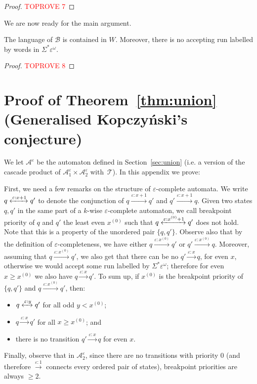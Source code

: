 \documentclass[a4paper,UKenglish,cleveref, thm-restate]{lipics-v2021}
\newcommand\po[1]{\todo[inline,size=\scriptsize,backgroundcolor=pink]{#1 - \textbf{Pierre}}}
\newcommand{\re}[1]{\xrightarrow{#1}}
\newcommand{\rer}[1]{\xleftrightarrow{#1}}
\newcommand{\eps}{\varepsilon}
\newcommand{\A}{\mathcal{A}}
\newcommand{\B}{\mathcal B}
\newcommand{\T}{\mathcal T}
\newcommand{\xbreak}{x^{(0)}}
\begin{document}
\begin{proof}\textcolor{red}{TOPROVE 7}\end{proof}

We are now ready for the main argument.

\begin{lemma}\label{lem:language-containement}
    The language of $\B$ is contained in $W$.
    Moreover, there is no accepting run labelled by words in $\Sigma^* \eps^\omega$.
\end{lemma}

\begin{proof}\textcolor{red}{TOPROVE 8}\end{proof}

\po{todo: figure} 

\section{Proof of Theorem~\ref{thm:union} (Generalised Kopczyński's conjecture)}\label{app:unon}
We let $\A^\eps$ be the automaton defined in Section~\ref{sec:union} (i.e. a version of the cascade product of $\A_{1}^\eps \times \A_{2}^\eps$ with~$\T$). In this appendix we prove:
\AepsCompleteUnion*

First, we need a few remarks on the structure of $\eps$-complete automata.
We write $q \rer{\eps:x+1} q'$ to denote the conjunction of $q \re{\eps:x+1} q' $ and $q' \re{\eps:x+1} q$.
Given two states $q,q'$ in the same part of a $k$-wise $\eps$-complete automaton, we call breakpoint priority of $q$ and $q'$ the least even $\xbreak$ such that $q \rer{\eps:\xbreak+1} q'$ does not hold.
Note that this is a property of the unordered pair $\{q,q'\}$.
Observe also that by the definition of $\eps$-completeness, we have either $q \re{\eps:\xbreak} q'$ or $q' \re{\eps:\xbreak} q$. Moreover, assuming that $q \re{\eps:\xbreak} q'$, we also get that there can be no $q' \re{\eps:x} q$, for even $x$, otherwise we would accept some run labelled by $\Sigma^* \eps^\omega$; therefore for even $x \geq \xbreak$ we also have $q \re{\eps:x} q'$.
To sum up, if $\xbreak$ is the breakpoint priority of $\{q,q'\}$ and $q \re{\eps:\xbreak} q'$, then: 
\begin{itemize}
    \item $q\rer{\eps:y} q'$ for all odd $y<\xbreak$;
    \item $q\re{\eps:x} q'$ for all $x\geq \xbreak$; and
    \item there is no transition $q'\re{\eps:x} q$ for even $x$.
\end{itemize}
Finally, observe that in $\A_2^\eps$, since there are no transitions with priority $0$ (and therefore $\re{\eps:1}$ connects every ordered pair of states), breakpoint priorities are always $\geq 2$.
\end{document}

